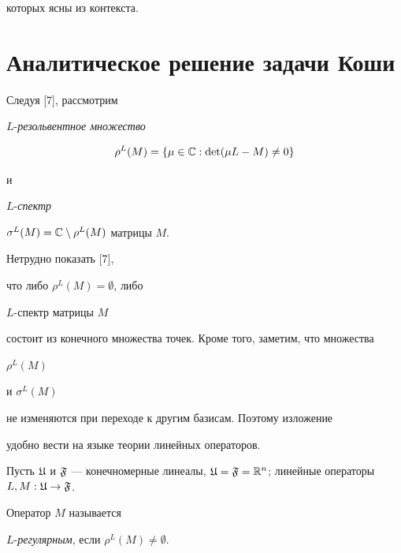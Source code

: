 которых ясны из контекста.











\section{Аналитическое решение задачи Коши}





Следуя [7], рассмотрим


$L$-{\it резольвентное множество}


$$


\rho^L(M)=\{\mu\in{\Bbb C} : \det (\mu L - M)\neq 0 \}


$$


и


$L$-{\it спектр}


$\sigma^L(M) = {\Bbb C}\setminus\rho^L(M)$ матрицы $M$.


Нетрудно показать [7],


что либо $\rho^L(M) = \emptyset$, либо\linebreak


$L$-спектр матрицы $M$


состоит из конечного множества точек. Кроме того, заметим, что множества


$\rho^L(M)$


и $\sigma^L(M)$


не изменяются при переходе к другим базисам. Поэтому изложение 


удобно вести на языке теории линейных операторов.





Пусть ${\frak U}$ и ${\frak F}$ --- конечномерные линеалы, ${\frak


U} = {\frak F} = \Bbb{R}^n$; линейные операторы $L, M : {\frak


U}\to {\frak F}$.





\begin{defns}


Оператор $M$ называется


$L$-{\it регулярным}, если $\rho^L(M) \neq \emptyset$.


\end{defns}





